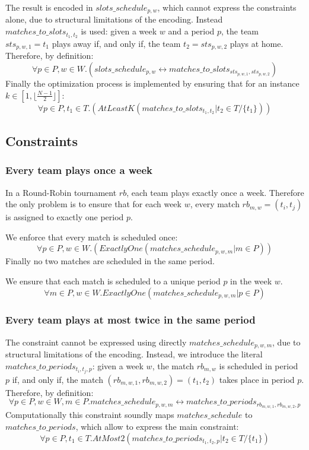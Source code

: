 The result is encoded in $slots\_schedule_{p, w}$, which cannot express the constraints alone, due to structural limitations of the encoding.
Instead \\$matches\_to\_slots_{t_1, t_2}$ is used: given a week $w$ and a period $p$, the team $sts_{p, w, 1} = t_1$ plays away if, and only if, the team $t_2 = sts_{p, w, 2}$ plays at home. Therefore, by definition:
$$
    \forall p \in P, w \in W.(slots\_schedule_{p, w} \leftrightarrow matches\_to\_slots_{sts_{p, w, 1}, sts_{p, w, 2}})
$$
Finally the optimization process is implemented by ensuring that for an instance $k \in [1, \lfloor\frac{N-1}{2}\rfloor]$:
$$
    \forall p \in P, t_1 \in T.(AtLeastK(matches\_to\_slots_{t_1, t_2} | t_2 \in T/\{t_1\}))
$$

\subsection{Constraints}
\subsubsection{Every team plays once a week}
In a Round-Robin tournament $rb$, each team plays exactly once a week. 
Therefore the only problem is to ensure that for each week $w$, every match $rb_{m, w} = (t_i, t_j)$ is assigned to exactly one period $p$.

We enforce that every match is scheduled once:
$$
    \forall p \in P, w \in W.(ExactlyOne(matches\_schedule_{p, w, m} | m \in P))
$$
Finally no two matches are scheduled in the same period. 

We ensure that each match is scheduled to a unique period $p$ in the week $w$.
$$
    \forall m \in P, w \in W. ExactlyOne(matches\_schedule_{p, w, m} | p \in P)
$$
\subsubsection{Every team plays at most twice in the same period}
The constraint cannot be expressed using directly $matches\_schedule_{p, w, m}$, due to structural limitations of the encoding. 
Instead, we introduce the literal $matches\_to\_periods_{t_i, t_j, p}$: given a week $w$, the match $rb_{m,w}$ is scheduled in period $p$ if, and only if, the match $(rb_{m, w, 1}, rb_{m, w, 2}) = (t_1, t_2)$ takes place in period $p$. Therefore, by definition: 
$$
    \forall p \in P, w \in W, m \in P.matches\_schedule_{p, w, m} \leftrightarrow matches\_to\_periods_{rb_{m, w, 1}, rb_{m, w, 2}, p}
$$
Computationally this constraint soundly maps $matches\_schedule$ to \\$matches\_to\_periods$, which allow to express the main constraint:
$$
    \forall p \in P, t_1 \in T. AtMost2(matches\_to\_periods_{t_1, t_2, p} | t_2 \in T/\{t_1\})
$$
